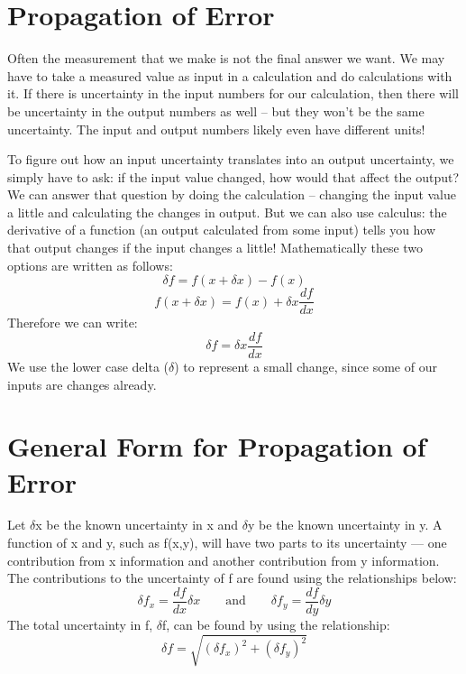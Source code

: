 \section*{Propagation of Error}
Often the measurement that we make is not the final answer we want. 
We may have to take a measured value as input in a calculation and do calculations with it. 
If there is uncertainty in the input numbers for our calculation, then there will be uncertainty in the output numbers as well – but they won't be the same uncertainty. 
The input and output numbers likely even have different units!
\par
To figure out how an input uncertainty translates into an output uncertainty, we simply have to ask: if the input value changed, how would that affect the output? 
We can answer that question by doing the calculation – changing the input value a little and calculating the changes in output. 
But we can also use calculus: the derivative of a function (an output calculated from some input) tells you how that output changes if the input changes a little! 
Mathematically these two options are written as follows:
\begin{equation}
\delta f = f(x + \delta x) - f(x)
\end{equation}
\begin{equation}
f(x + \delta x) = f(x) + \delta x \frac{df}{dx}
\end{equation}
Therefore we can write:
\begin{equation}
\delta f = \delta x \frac{df}{dx}
\end{equation}
We use the lower case delta ($\delta$) to represent a small change, since some of our inputs are changes already. 

\section*{General Form for Propagation of Error}
Let $\delta$x be the known uncertainty in x and $\delta$y be the known uncertainty in y. 
A function of x and y, such as f(x,y), will have two parts to its uncertainty — one contribution from x information and another contribution from y information. 
The contributions to the uncertainty of f are found using the relationships below:
\[ \delta f_{x} = \frac{df}{dx} \delta x \qquad \mathrm{and} \qquad \delta f_{y} = \frac{df}{dy} \delta y \]
The total uncertainty in f, $\delta$f, can be found by using the relationship:
\begin{equation}
\delta f = \sqrt{(\delta f_{x})^{2}+(\delta f_{y})^{2}}
\end{equation}

